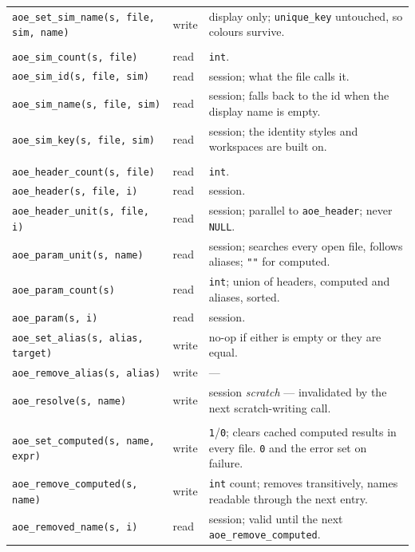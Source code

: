 \documentclass[11pt,a4paper,oneside]{report}
\newcommand{\code}[1]{\texttt{#1}}
\begin{document}
\begin{longtable}{@{}p{}p{}p{}@{}}
\code{aoe\_set\_sim\_name(s, file, sim, name)} & write & display only; \code{unique\_key} untouched, so colours survive. \\
\addlinespace
\multicolumn{3}{@{}l@{}}{\textit{Runs}} \\
\code{aoe\_sim\_count(s, file)} & read & \code{int}. \\
\code{aoe\_sim\_id(s, file, sim)} & read & session; what the file calls it. \\
\code{aoe\_sim\_name(s, file, sim)} & read & session; falls back to the id when the display name is empty. \\
\code{aoe\_sim\_key(s, file, sim)} & read & session; the identity styles and workspaces are built on. \\
\addlinespace
\multicolumn{3}{@{}l@{}}{\textit{Channels and names}} \\
\code{aoe\_header\_count(s, file)} & read & \code{int}. \\
\code{aoe\_header(s, file, i)} & read & session. \\
\code{aoe\_header\_unit(s, file, i)} & read & session; parallel to \code{aoe\_header}; never \code{NULL}. \\
\code{aoe\_param\_unit(s, name)} & read & session; searches every open file, follows aliases; \code{""} for computed. \\
\code{aoe\_param\_count(s)} & read & \code{int}; union of headers, computed and aliases, sorted. \\
\code{aoe\_param(s, i)} & read & session. \\
\code{aoe\_set\_alias(s, alias, target)} & write & no-op if either is empty or they are equal. \\
\code{aoe\_remove\_alias(s, alias)} & write & --- \\
\code{aoe\_resolve(s, name)} & write & session \emph{scratch} --- invalidated by the next scratch-writing call. \\
\addlinespace
\multicolumn{3}{@{}l@{}}{\textit{Computed parameters}} \\
\code{aoe\_set\_computed(s, name, expr)} & write & \code{1}/\code{0}; clears cached computed results in every file. \code{0} and the error set on failure. \\
\code{aoe\_remove\_computed(s, name)} & write & \code{int} count; removes transitively, names readable through the next entry. \\
\code{aoe\_removed\_name(s, i)} & read & session; valid until the next \code{aoe\_remove\_computed}. \\

\end{longtable}
\end{document}
